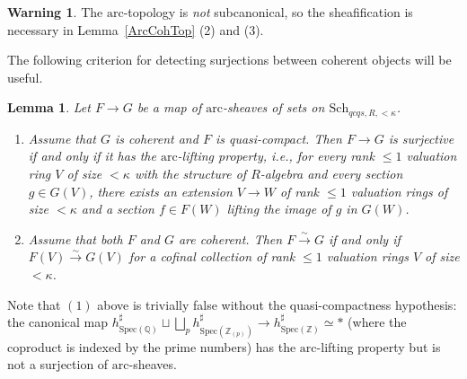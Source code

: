 \documentclass[reqno]{amsart}
\newcommand{\spec}{\mathrm{Spec}}
\newcommand{\arc}{\mathrm{arc}}
\newtheorem{lemma}[theorem]{Lemma}
\theoremstyle{definition}
\newtheorem{warning}[theorem]{Warning}
\begin{document}
\begin{warning}
The $\arc$-topology is {\em not} subcanonical, so the sheafification is necessary in Lemma~\ref{ArcCohTop} (2) and (3).
\end{warning}



The following criterion for detecting surjections between coherent objects will be useful. 

\begin{lemma}
\label{CohArcSheafIsomCrit}
Let $F \to G$ be a map of $\arc$-sheaves of sets on $\mathrm{Sch}_{qcqs, R, < \kappa}$. 
\begin{enumerate}
\item Assume that $G$ is coherent and $F$ is quasi-compact. Then $F \to G$ is
surjective if and only if it has the $\arc$-lifting property, i.e., for every
rank $\leq 1$ valuation ring $V$ of size $< \kappa$ with the structure of
$R$-algebra and every section $g \in G(V)$, there exists an extension $V \to W$ of rank $\leq 1$ valuation rings of size $< \kappa$ and a section $f \in F(W)$ lifting the image of $g$ in $G(W)$.
\item Assume that both $F$ and $G$ are coherent. Then $F
\xrightarrow{\sim} G$ if and only if $F(V) \xrightarrow{\sim} G(V)$ for a cofinal collection of rank $\leq 1$ valuation rings $V$ of size $< \kappa$.
\end{enumerate}
\end{lemma}

Note that $(1)$ above is trivially false without the quasi-compactness
hypothesis: the canonical map $h_{\spec( \mathbb{Q})}^{\sharp} \sqcup \bigsqcup_p h_{\mathrm{Spec}(\mathbb{Z}_{(p)})}^\sharp \to h_{\mathrm{Spec}(\mathbb{Z})}^\sharp \simeq \ast$ (where the coproduct is indexed by the prime numbers) has the $\arc$-lifting property but is not a surjection of $\arc$-sheaves. 
\end{document}
